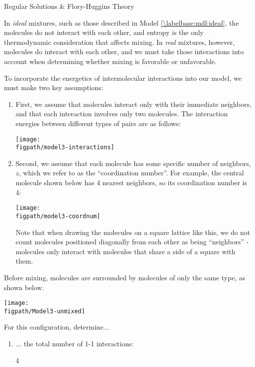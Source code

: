 \begin{activity}{Regular Solutions \& Flory-Huggins Theory}
\begin{ctqs}
\end{ctqs}
	
\clearpage
\begin{model}
\label{\labelbase:mdl:regular}

In \emph{ideal} mixtures, such as those described in Model \ref{\labelbase:mdl:ideal}, the molecules do not interact with each other, and entropy is the only thermodynamic consideration that affects mixing.
In \emph{real} mixtures, however, molecules do interact with each other, and we must take those interactions into account when determining whether mixing is favorable or unfavorable.

To incorporate the energetics of intermolecular interactions into our model, we must make two key assumptions:
\begin{enumerate}
	\item First, we assume that molecules interact only with their immediate neighbors, and that each interaction involves only two molecules.  The interaction energies between different types of pairs are as follows:

\centerline{\texttt{[image: \\figpath/model3-interactions]}}
	
	\item Second, we assume that each molecule has some specific number of neighbors, $z$, which we refer to as the ``coordination number''.  For example, the central molecule shown below has 4 nearest neighbors, so its coordination number is 4:

\centerline{\texttt{[image: \\figpath/model3-coordnum]}}

		Note that when drawing the molecules on a square lattice like this, we do not count molecules positioned diagonally from each other as being ``neighbors'' - molecules only interact with molecules that share a side of a square with them.

\end{enumerate}

\end{model}

\begin{ctqs}

	\question Before mixing, molecules are surrounded by molecules of only the same type, as shown below. \label{\labelbase:ctq:unmixedenthalpy}
	
		\centerline{\texttt{[image: \\figpath/Model3-unmixed]}}	
	
		For this configuration, determine...
		\begin{enumerate}	
			\item ... the total number of 1-1 interactions:
				\begin{solution}[0.25in]
					4
				\end{solution}
			

\end{enumerate}
\end{ctqs}
\end{activity}
